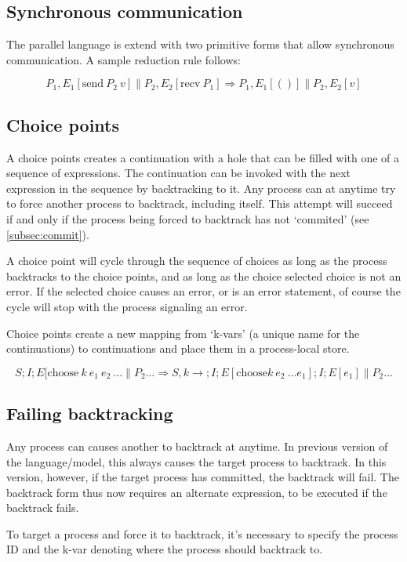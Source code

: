 \documentclass[11pt]{article}
\begin{document}
\subsection{Synchronous communication}
The parallel language is extend with two primitive forms that allow
synchronous communication. A sample reduction rule follows:

$$
P_1,E_1[\text{send}~P_2~v] \parallel P_2,E_2[\text{recv}~P_1]
\Rightarrow
P_1,E_1[()] \parallel P_2,E_2[v]
$$

\subsection{Choice points}
A choice points creates a continuation with a hole that can be filled
with one of a sequence of expressions. The continuation can be invoked with
the next expression in the sequence by backtracking to it. Any process
can at anytime try to force another process to backtrack, including
itself. This attempt will succeed if and only if the process being
forced to backtrack has not `commited' (see \ref{subsec:commit}). 

A choice point will cycle through the sequence of choices as long as the
process backtracks to the choice points, and as long as the choice
selected choice is not an error. If the selected choice causes an error,
or is an error statement, of course the cycle will stop with the process
signaling an error.

Choice points create a new mapping from `k-vars' (a unique name for
the continuations) to continuations and place them in a process-local
store.

$$
  S;I;E[\text{choose}~k~e_1~e_2~\dots\parallel P_2 \dots \Rightarrow
  S,k\to;I;E[\text{choose}k~e_2~\dots e_1];I;E[e_1] \parallel P_2 \dots$$

\subsection{Failing backtracking}
Any process can causes another to backtrack at anytime. In previous
version of the language/model, this always causes the target process to
backtrack. In this version, however, if the target process has
committed, the backtrack will fail. The backtrack form thus now requires 
an alternate expression, to be executed if the backtrack fails.

To target a process and force it to backtrack, it's necessary to specify
the process ID and the k-var denoting where the process should backtrack
to.
\end{document}
